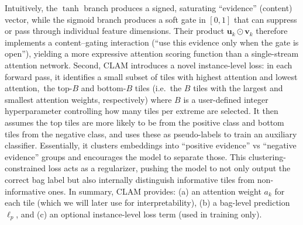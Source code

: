 Intuitively, the $\tanh$ branch produces a signed, saturating ``evidence'' (content) vector, while the sigmoid branch produces a soft gate in $[0,1]$ that can suppress or pass through individual feature dimensions. Their product $\mathbf{u}_k\odot\mathbf{v}_k$ therefore implements a content--gating interaction (``use this evidence only when the gate is open''), yielding a more expressive attention scoring function than a single-stream attention network. Second, CLAM introduces a novel instance-level loss: in each forward pass, it identifies a small subset of tiles with highest attention and lowest attention,\ the top-$B$ and bottom-$B$ tiles (i.e.\ the $B$ tiles with the largest and smallest attention weights, respectively) where $B$ is a user-defined integer hyperparameter controlling how many tiles per extreme are selected. It then assumes the top tiles are more likely to be from the positive class and bottom tiles from the negative class, and uses these as pseudo-labels to train an auxiliary classifier. Essentially, it clusters embeddings into “positive evidence” vs “negative evidence” groups and encourages the model to separate those. This clustering-constrained loss acts as a regularizer, pushing the model to not only output the correct bag label but also internally distinguish informative tiles from non-informative ones. In summary, CLAM provides: (a) an attention weight $a_k$ for each tile (which we will later use for interpretability), (b) a bag-level prediction $\ell_p$, and (c) an optional instance-level loss term (used in training only).

